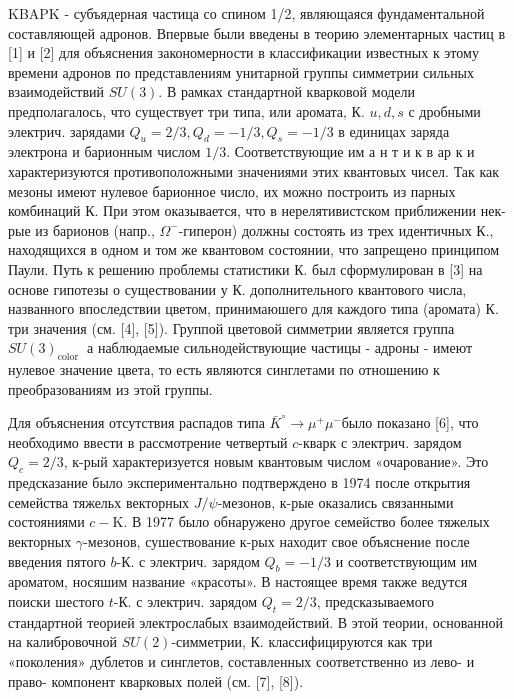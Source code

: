 \documentclass[10pt]{article}
\begin{document}
KBAPK - субъядерная частица со спином 1/2, являющаяся фундаментальной составляющей адронов. Впервые были введены в теорию элементарных частиц в [1] и [2] для объяснения закономерности в классификации известных к этому времени адронов по представлениям унитарной группы симметрии сильных взаимодействий $S U(3)$. В рамках стандартной кварковой модели предполагалось, что существует три типа, или аромата, К. $u, d, s$ с дробными электрич. зарядами $Q_{u}=2 / 3, Q_{d}=-1 / 3, Q_{s}=-1 / 3$ в единицах заряда электрона и барионным числом $1 / 3$. Соответствующие им а н т и к в ар к и характеризуются противоположными значениями этих квантовых чисел. Так как мезоны имеют нулевое барионное число, их можно построить из парных комбинаций К. При этом оказывается, что в нерелятивистском приближении нек-рые из барионов (напр., $\Omega^{-}$-гиперон) должны состоять из трех идентичных К., находящихся в одном и том же квантовом состоянии, что запрещено принципом Паули. Путь к решению проблемы статистики К. был сформулирован в [3] на основе гипотезы о существовании у К. дополнительного квантового числа, названного впоследствии цветом, принимаюшего для каждого типа (аромата) К. три значения (см. [4], [5]). Группой цветовой симметрии является группа $S U(3)_{\text {color }}$ а наблюдаемые сильнодействующие частицы - адроны - имеют нулевое значение цвета, то есть являются синглетами по отношению к преобразованиям из этой группы.



Для объяснения отсутствия распадов типа $\bar{K}^{\circ} \rightarrow \mu^{+} \mu^{-}$было показано [6], что необходимо ввести в рассмотрение четвертый $c$-кварк с электрич. зарядом $Q_{c}=2 / 3$, к-рый характеризуется новым квантовым числом «очарование». Это предсказание было экспериментально подтверждено в 1974 после открытия семейства тяжельх векторных $J / \psi$-мезонов, к-рые оказались связанными состояниями $c-\mathrm{K}$. В 1977 было обнаружено другое семейство более тяжелых векторных $\gamma$-мезонов, сушествование к-рых находит свое объяснение после введения пятого $b$-К. с электрич. зарядом $Q_{b}=-1 / 3$ и соответствующим им ароматом, носяшим название «красоты». В настоящее время также ведутся поиски шестого $t$-К. с электрич. зарядом $Q_{t}=2 / 3$, предсказываемого стандартной теорией электрослабых взаимодействий. В этой теории, основанной на калибровочной $S U(2)$-симметрии, К. классифицируются как три «поколения» дублетов и синглетов, составленных соответственно из лево- и право- компонент кварковых полей (см. [7], [8]).
\end{document}
